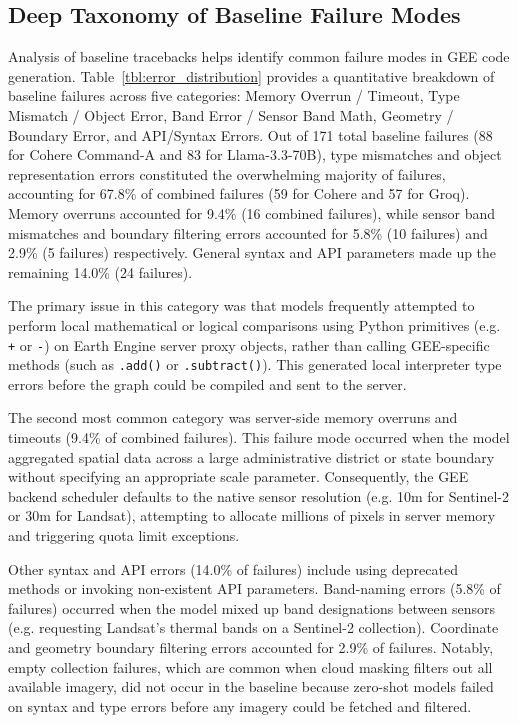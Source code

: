 \documentclass[pdflatex,sn-mathphys-ay]{sn-jnl}
\begin{document}
\subsection{Deep Taxonomy of Baseline Failure Modes}\label{sec:res_taxonomy}
Analysis of baseline tracebacks helps identify common failure modes in GEE code generation. Table~\ref{tbl:error_distribution} provides a quantitative breakdown of baseline failures across five categories: Memory Overrun / Timeout, Type Mismatch / Object Error, Band Error / Sensor Band Math, Geometry / Boundary Error, and API/Syntax Errors. Out of 171 total baseline failures (88 for Cohere Command-A and 83 for Llama-3.3-70B), type mismatches and object representation errors constituted the overwhelming majority of failures, accounting for 67.8\% of combined failures (59 for Cohere and 57 for Groq). Memory overruns accounted for 9.4\% (16 combined failures), while sensor band mismatches and boundary filtering errors accounted for 5.8\% (10 failures) and 2.9\% (5 failures) respectively. General syntax and API parameters made up the remaining 14.0\% (24 failures).

The primary issue in this category was that models frequently attempted to perform local mathematical or logical comparisons using Python primitives (e.g. \texttt{+} or \texttt{-}) on Earth Engine server proxy objects, rather than calling GEE-specific methods (such as \texttt{.add()} or \texttt{.subtract()}). This generated local interpreter type errors before the graph could be compiled and sent to the server.

The second most common category was server-side memory overruns and timeouts (9.4\% of combined failures). This failure mode occurred when the model aggregated spatial data across a large administrative district or state boundary without specifying an appropriate scale parameter. Consequently, the GEE backend scheduler defaults to the native sensor resolution (e.g. 10m for Sentinel-2 or 30m for Landsat), attempting to allocate millions of pixels in server memory and triggering quota limit exceptions.

Other syntax and API errors (14.0\% of failures) include using deprecated methods or invoking non-existent API parameters. Band-naming errors (5.8\% of failures) occurred when the model mixed up band designations between sensors (e.g. requesting Landsat's thermal bands on a Sentinel-2 collection). Coordinate and geometry boundary filtering errors accounted for 2.9\% of failures. Notably, empty collection failures, which are common when cloud masking filters out all available imagery, did not occur in the baseline because zero-shot models failed on syntax and type errors before any imagery could be fetched and filtered.
\end{document}
